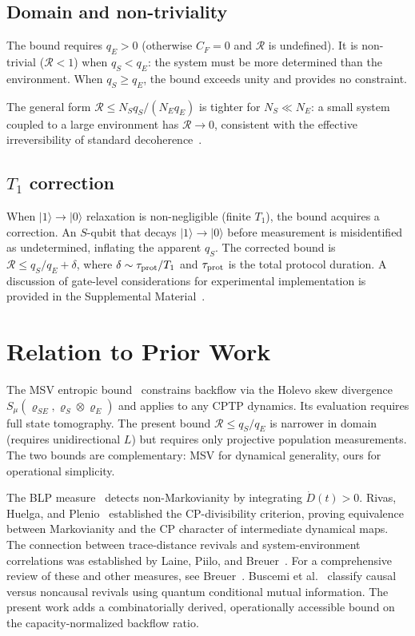 \documentclass[aps,prl,twocolumn,superscriptaddress,hyperref]{revtex4-2}
\begin{document}
\subsection{Domain and non-triviality}

The bound requires $q_E > 0$ (otherwise $C_F = 0$ and $\mathcal{R}$ is undefined). It is non-trivial ($\mathcal{R} < 1$) when $q_S < q_E$: the system must be more determined than the environment. When $q_S \geq q_E$, the bound exceeds unity and provides no constraint.

The general form $\mathcal{R} \leq N_S q_S/(N_E q_E)$ is tighter for $N_S \ll N_E$: a small system coupled to a large environment has $\mathcal{R} \to 0$, consistent with the effective irreversibility of standard decoherence~\cite{Breuer:2016}.

\subsection{$T_1$ correction}

When $|1\rangle \to |0\rangle$ relaxation is non-negligible (finite $T_1$), the bound acquires a correction. An $S$-qubit that decays $|1\rangle \to |0\rangle$ before measurement is misidentified as undetermined, inflating the apparent $q_S$. The corrected bound is $\mathcal{R} \leq q_S/q_E + \delta$, where $\delta \sim \tau_{\rm prot}/T_1$ and $\tau_{\rm prot}$ is the total protocol duration. A discussion of gate-level considerations for experimental implementation is provided in the Supplemental Material~\cite{SM}.

\section{Relation to Prior Work}

The MSV entropic bound~\cite{Megier:2021} constrains backflow via the Holevo skew divergence $S_\mu(\varrho_{SE}, \varrho_S \otimes \varrho_E)$ and applies to any CPTP dynamics. Its evaluation requires full state tomography. The present bound $\mathcal{R} \leq q_S/q_E$ is narrower in domain (requires unidirectional $L$) but requires only projective population measurements. The two bounds are complementary: MSV for dynamical generality, ours for operational simplicity.

The BLP measure~\cite{Breuer:2009, Breuer:2016} detects non-Markovianity by integrating $\dot{D}(t) > 0$. Rivas, Huelga, and Plenio~\cite{Rivas:2010} established the CP-divisibility criterion, proving equivalence between Markovianity and the CP character of intermediate dynamical maps. The connection between trace-distance revivals and system-environment correlations was established by Laine, Piilo, and Breuer~\cite{Laine:2010}. For a comprehensive review of these and other measures, see Breuer~\cite{Breuer:2012}. Buscemi et al.~\cite{Buscemi:2025} classify causal versus noncausal revivals using quantum conditional mutual information. The present work adds a combinatorially derived, operationally accessible bound on the capacity-normalized backflow ratio.
\end{document}

